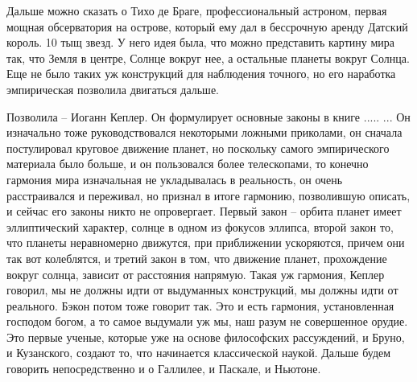 \documentclass[a4paper, 12pt]{article}
\begin{document}
Дальше можно сказать о Тихо де Браге, профессиональный астроном, первая 
мощная обсерватория на острове, который ему дал в бессрочную аренду 
Датский король. 10 тыщ звезд. У него идея была, что можно представить 
картину мира так, что Земля в центре, Солнце вокруг нее, а остальные 
планеты вокруг Солнца. Еще не было таких уж конструкций для наблюдения 
точного, но его наработка эмпирическая позволила двигаться дальше.

Позволила -- Иоганн Кеплер. Он формулирует основные законы в книге ..... 
... Он изначально тоже руководствовался некоторыми ложными приколами, он 
сначала постулировал круговое движение планет, но поскольку самого 
эмпирического материала было больше, и он пользовался более телескопами, 
то конечно гармония мира изначальная не укладывалась в реальность, он 
очень расстраивался и переживал, но признал в итоге гармонию, 
позволившую описать, и сейчас его законы никто не опровергает. Первый 
закон -- орбита планет имеет эллиптический характер, солнце в одном из 
фокусов эллипса, второй закон то, что планеты неравномерно движутся, при 
приближении ускоряются, причем они так вот колеблятся, и третий закон 
в том, что движение планет, прохождение вокруг солнца, зависит от 
расстояния напрямую. Такая уж гармония, Кеплер говорил, мы не должны 
идти от выдуманных конструкций, мы должны идти от реального. Бэкон потом 
тоже говорит так. Это и есть гармония, установленная господом богом, 
а то самое выдумали уж мы, наш разум не совершенное орудие. Это первые 
ученые, которые уже на основе философских рассуждений, и Бруно, 
и Кузанского, создают то, что начинается классической наукой. Дальше 
будем говорить непосредственно и о Галлилее, и Паскале, и Ньютоне.
\end{document}
